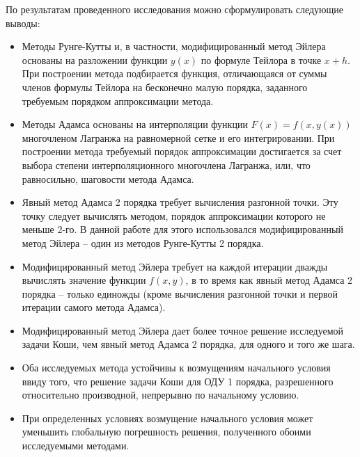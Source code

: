 \documentclass[a4paper, 12pt]{article}
\theoremstyle{mythm}
\begin{document}
	По результатам проведенного исследования можно сформулировать следующие выводы:
	\begin{itemize}
		\item Методы Рунге-Кутты и, в частности, модифицированный метод Эйлера основаны на разложении функции $y(x)$ по формуле Тейлора в точке $x+h$. При построении метода подбирается функция, отличающаяся от суммы членов формулы Тейлора на бесконечно малую порядка, заданного требуемым порядком аппроксимации метода.
		\item Методы Адамса основаны на интерполяции функции $F(x)=f(x,y(x))$ многочленом Лагранжа на равномерной сетке и его интегрировании. При построении метода требуемый порядок аппроксимации достигается за счет выбора степени интерполяционного многочлена Лагранжа, или, что равносильно, шаговости метода Адамса.
		\item Явный метод Адамса 2 порядка требует вычисления разгонной точки. Эту точку следует вычислять методом, порядок аппроксимации которого не меньше 2-го. В данной работе для этого использовался модифицированный метод Эйлера -- один из методов Рунге-Кутты 2 порядка.
		\item Модифицированный метод Эйлера требует на каждой итерации дважды вычислять значение функции $f(x,y)$, в то время как явный метод Адамса 2 порядка -- только единожды (кроме вычисления разгонной точки и первой итерации самого метода Адамса).
		\item Модифицированный метод Эйлера дает более точное решение исследуемой задачи Коши, чем явный метод Адамса 2 порядка, для одного и того же шага.
		\item Оба исследуемых метода устойчивы к возмущениям начального условия ввиду того, что решение задачи Коши для ОДУ 1 порядка, разрешенного относительно производной, непрерывно по начальному условию.
		\item При определенных условиях возмущение начального условия может уменьшить глобальную погрешность решения, полученного обоими исследуемыми методами.
	\end{itemize}
	
\end{document}
